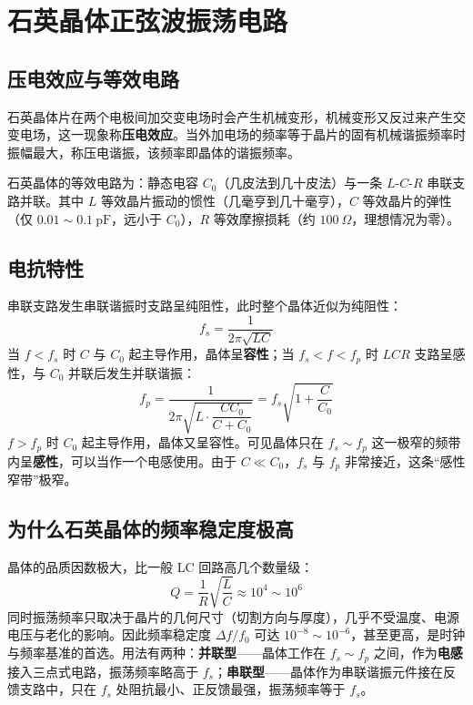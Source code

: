 \section{石英晶体正弦波振荡电路}
\subsection{压电效应与等效电路}
石英晶体片在两个电极间加交变电场时会产生机械变形，机械变形又反过来产生交变电场，这一现象称\textbf{压电效应}。当外加电场的频率等于晶片的固有机械谐振频率时振幅最大，称压电谐振，该频率即晶体的谐振频率。

石英晶体的等效电路为：静态电容 $C_0$（几皮法到几十皮法）与一条 $L$-$C$-$R$ 串联支路并联。其中 $L$ 等效晶片振动的惯性（几毫亨到几十毫亨），$C$ 等效晶片的弹性（仅 $0.01\sim0.1\ \mathrm{pF}$，远小于 $C_0$），$R$ 等效摩擦损耗（约 $100\ \Omega$，理想情况为零）。

\subsection{电抗特性}
串联支路发生串联谐振时支路呈纯阻性，此时整个晶体近似为纯阻性：
\begin{equation}
f_s=\frac{1}{2\pi\sqrt{LC}}
\end{equation}
当 $f<f_s$ 时 $C$ 与 $C_0$ 起主导作用，晶体呈\textbf{容性}；当 $f_s<f<f_p$ 时 $LCR$ 支路呈感性，与 $C_0$ 并联后发生并联谐振：
\begin{equation}
f_p=\frac{1}{2\pi\sqrt{L\cdot\dfrac{CC_0}{C+C_0}}}
=f_s\sqrt{1+\frac{C}{C_0}}
\end{equation}
$f>f_p$ 时 $C_0$ 起主导作用，晶体又呈容性。可见晶体只在 $f_s\sim f_p$ 这一极窄的频带内呈\textbf{感性}，可以当作一个电感使用。由于 $C\ll C_0$，$f_s$ 与 $f_p$ 非常接近，这条“感性窄带”极窄。

\subsection{为什么石英晶体的频率稳定度极高}
晶体的品质因数极大，比一般 LC 回路高几个数量级：
\begin{equation}
Q=\frac{1}{R}\sqrt{\frac{L}{C}}\approx10^4\sim10^6
\end{equation}
同时振荡频率只取决于晶片的几何尺寸（切割方向与厚度），几乎不受温度、电源电压与老化的影响。因此频率稳定度 $\Delta f/f_0$ 可达 $10^{-8}\sim10^{-6}$，甚至更高，是时钟与频率基准的首选。用法有两种：\textbf{并联型}——晶体工作在 $f_s\sim f_p$ 之间，作为\textbf{电感}接入三点式电路，振荡频率略高于 $f_s$；\textbf{串联型}——晶体作为串联谐振元件接在反馈支路中，只在 $f_s$ 处阻抗最小、正反馈最强，振荡频率等于 $f_s$。

